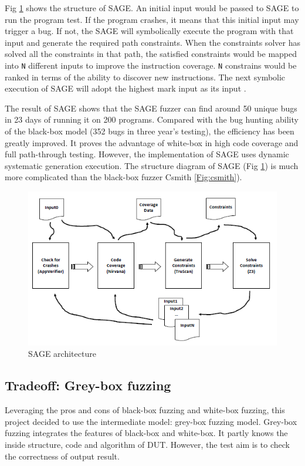 Fig \ref{Fig:sage} shows the structure of SAGE. An initial input would be passed to SAGE to run the program test. If the program crashes, it means that this initial input may trigger a bug. If not, the SAGE will symbolically execute the program with that input and generate the required path constraints. When the constraints solver has solved all the constraints in that path, the satisfied constraints would be mapped into \texttt{N} different inputs to improve the instruction coverage. \texttt{N} constrains would be ranked in terms of the ability to discover new instructions. The next symbolic execution of SAGE will adopt the highest mark input as its input \cite{bounimova2013billions}.

The result of SAGE shows that the SAGE fuzzer can find around 50 unique bugs in 23 days of running it on 200 programs. Compared with the bug hunting ability of the black-box model (352 bugs in three year's testing), the efficiency has been greatly improved. It proves the advantage of white-box in high code coverage and full path-through testing. However, the implementation of SAGE uses dynamic systematic generation execution. The structure diagram of SAGE (Fig \ref{Fig:sage}) is much more complicated than the black-box fuzzer Csmith \ref{Fig:csmith}). 
\begin{figure}[htb]
\centering
\includegraphics[scale=0.9]{MScThesisTemplate/Figs/sage.PNG}
\caption{\footnotesize SAGE architecture\cite{bounimova2013billions}}
\label{Fig:sage}
\end{figure}

\subsection{Tradeoff: Grey-box fuzzing}
Leveraging the pros and cons of black-box fuzzing and white-box fuzzing, this project decided to use the intermediate model: grey-box fuzzing model. Grey-box fuzzing integrates the features of black-box and white-box. It partly knows the inside structure, code and algorithm of DUT. However, the test aim is to check the correctness of output result. 

